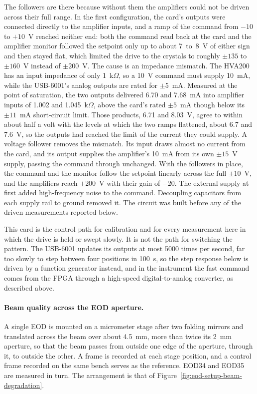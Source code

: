 \documentclass{article}
\begin{document}
The followers are there because without them the amplifiers could not be driven across their
full range. In the first configuration, the card's outputs were connected directly to the
amplifier inputs, and a ramp of the command from $-10$ to $+10$~V reached neither end: both the
command read back at the card and the amplifier monitor followed the setpoint only up to about
7~to~8~V of either sign and then stayed flat, which limited the drive to the crystals to roughly
$\pm135$ to $\pm160$~V instead of $\pm200$~V. The cause is an impedance mismatch. The HVA200 has
an input impedance of only 1~k$\Omega$, so a 10~V command must supply 10~mA, while the USB-6001's
analog outputs are rated for $\pm5$~mA. Measured at the point of saturation, the two outputs
delivered 6.70 and 7.68~mA into amplifier inputs of 1.002 and 1.045~k$\Omega$, above the card's
rated $\pm5$~mA though below its $\pm11$~mA short-circuit limit. Those products, 6.71 and 8.03~V,
agree to within about half a volt with the levels at which the two ramps flattened, about 6.7 and
7.6~V, so the outputs had reached the limit of the current they could supply. A voltage follower removes the mismatch. Its input draws
almost no current from the card, and its output supplies the amplifier's 10~mA from its own
$\pm15$~V supply, passing the command through unchanged. With the followers in place, the command
and the monitor follow the setpoint linearly across the full $\pm10$~V, and the amplifiers reach
$\pm200$~V with their gain of $-20$. The external supply at first added high-frequency noise to the
command. Decoupling capacitors from each supply rail to ground removed it. The circuit was built
before any of the driven measurements reported below.

This card is the control path for calibration and for every measurement here in which the drive is
held or swept slowly. It is not the path for switching the pattern. The USB-6001 updates its
outputs at most 5000 times per second, far too slowly to step between four positions in
100~\textmu s, so the step response below is driven by a function generator instead, and in the
instrument the fast command comes from the FPGA through a high-speed digital-to-analog converter,
as described above.

\paragraph{Beam quality across the EOD aperture.}
A single EOD is mounted on a micrometer stage after two folding mirrors and translated
across the beam over about 4.5~mm, more than twice its 2~mm aperture, so that the beam passes from
outside one edge of the aperture, through it, to outside the other. A frame is recorded at each stage position, and a control frame recorded on the same
bench serves as the reference. EOD34 and EOD35 are measured in turn. The arrangement is that of
Figure~\ref{fig:eod-setup-beam-degradation}.
\end{document}

